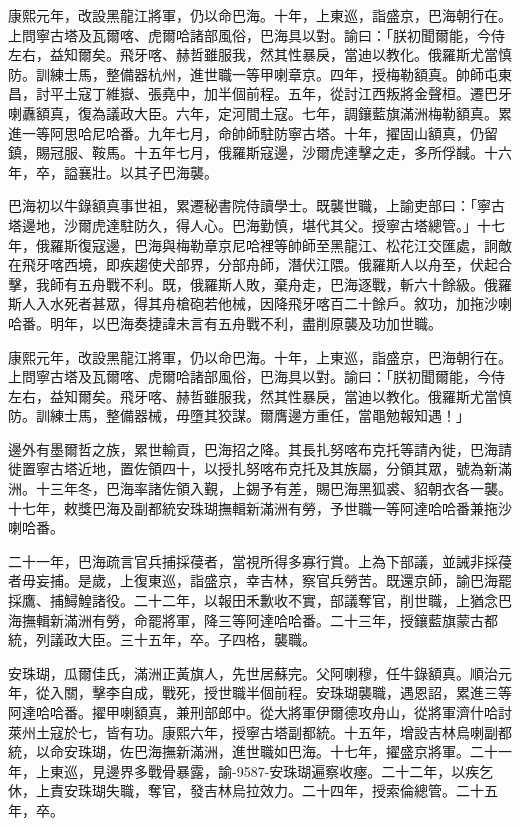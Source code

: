 \begin{pinyinscope}
康熙元年，改設黑龍江將軍，仍以命巴海。十年，上東巡，詣盛京，巴海朝行在。上問寧古塔及瓦爾喀、虎爾哈諸部風俗，巴海具以對。諭曰：「朕初聞爾能，今侍左右，益知爾矣。飛牙喀、赫哲雖服我，然其性暴戾，當迪以教化。俄羅斯尤當慎防。訓練士馬，整備器杭州，進世職一等甲喇章京。四年，授梅勒額真。帥師屯東昌，討平土寇丁維嶽、張堯中，加半個前程。五年，從討江西叛將金聲桓。遷巴牙喇纛額真，復為議政大臣。六年，定河間土寇。七年，調鑲藍旗滿洲梅勒額真。累進一等阿思哈尼哈番。九年七月，命帥師駐防寧古塔。十年，擢固山額真，仍留鎮，賜冠服、鞍馬。十五年七月，俄羅斯寇邊，沙爾虎達擊之走，多所俘馘。十六年，卒，謚襄壯。以其子巴海襲。

巴海初以牛錄額真事世祖，累遷秘書院侍讀學士。既襲世職，上諭吏部曰：「寧古塔邊地，沙爾虎達駐防久，得人心。巴海勤慎，堪代其父。授寧古塔總管。」十七年，俄羅斯復寇邊，巴海與梅勒章京尼哈裡等帥師至黑龍江、松花江交匯處，詗敵在飛牙喀西境，即疾趨使犬部界，分部舟師，潛伏江隈。俄羅斯人以舟至，伏起合擊，我師有五舟戰不利。既，俄羅斯人敗，棄舟走，巴海逐戰，斬六十餘級。俄羅斯人入水死者甚眾，得其舟槍砲若他械，因降飛牙喀百二十餘戶。敘功，加拖沙喇哈番。明年，以巴海奏捷諱未言有五舟戰不利，盡削原襲及功加世職。

康熙元年，改設黑龍江將軍，仍以命巴海。十年，上東巡，詣盛京，巴海朝行在。上問寧古塔及瓦爾喀、虎爾哈諸部風俗，巴海具以對。諭曰：「朕初聞爾能，今侍左右，益知爾矣。飛牙喀、赫哲雖服我，然其性暴戾，當迪以教化。俄羅斯尤當慎防。訓練士馬，整備器械，毋墮其狡謀。爾膺邊方重任，當黽勉報知遇！」

邊外有墨爾哲之族，累世輸貢，巴海招之降。其長扎努喀布克托等請內徙，巴海請徙置寧古塔近地，置佐領四十，以授扎努喀布克托及其族屬，分領其眾，號為新滿洲。十三年冬，巴海率諸佐領入覲，上錫予有差，賜巴海黑狐裘、貂朝衣各一襲。十七年，敕獎巴海及副都統安珠瑚撫輯新滿洲有勞，予世職一等阿達哈哈番兼拖沙喇哈番。

二十一年，巴海疏言官兵捕採葠者，當視所得多寡行賞。上為下部議，並誡非採葠者毋妄捕。是歲，上復東巡，詣盛京，幸吉林，察官兵勞苦。既還京師，諭巴海罷採鷹、捕鱘鰉諸役。二十二年，以報田禾歉收不實，部議奪官，削世職，上猶念巴海撫輯新滿洲有勞，命罷將軍，降三等阿達哈哈番。二十三年，授鑲藍旗蒙古都統，列議政大臣。三十五年，卒。子四格，襲職。

安珠瑚，瓜爾佳氏，滿洲正黃旗人，先世居蘇完。父阿喇穆，任牛錄額真。順治元年，從入關，擊李自成，戰死，授世職半個前程。安珠瑚襲職，遇恩詔，累進三等阿達哈哈番。擢甲喇額真，兼刑部郎中。從大將軍伊爾德攻舟山，從將軍濟什哈討萊州土寇於七，皆有功。康熙六年，授寧古塔副都統。十五年，增設吉林烏喇副都統，以命安珠瑚，佐巴海撫新滿洲，進世職如巴海。十七年，擢盛京將軍。二十一年，上東巡，見邊界多戰骨暴露，諭-9587-安珠瑚遍察收瘞。二十二年，以疾乞休，上責安珠瑚失職，奪官，發吉林烏拉效力。二十四年，授索倫總管。二十五年，卒。


\end{pinyinscope}
